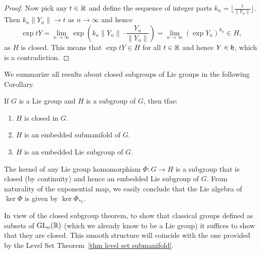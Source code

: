 \begin{proof}
    Now pick any $t\in \mathbb{R}$ and define the sequence of integer parts $k_n=\lfloor\frac{t}{\lVert Y_n\rVert}\rfloor$. Then $k_n\lVert Y_n\rVert\to t$ as $n\to\infty$ and hence
    \[\exp tY=\lim_{n\to \infty}\exp\left(k_n\lVert Y_n\rVert\cdot \frac{Y_n}{\lVert Y_n\rVert}\right)=\lim_{n\to\infty}\left(\exp Y_n\right)^{k_n}\in H,\]
    as $H$ is closed. This means that $\exp tY\in H$ for all $t\in\mathbb{R}$ and hence $Y\in\mathfrak{h}$, which is a contradiction.
\end{proof}

We summarize all results about closed subgroups of Lie groups in the following Corollary.

\begin{cor}
    If $G$ is a Lie group and $H$ is a subgroup of $G$, then \gls{tfae}:
    \begin{enumerate}
        \item $H$ is closed in $G$.
        \item $H$ is an embedded submanifold of $G$.
        \item $H$ is an embedded Lie subgroup of $G$.
    \end{enumerate}
\end{cor}

\begin{example}\label{example kernel Lie subgroup}
    The kernel of any Lie group homomorphism $\Phi:G\to H$ is a subgroup that is closed (by continuity) and hence an embedded Lie subgroup of $G$. From naturality of the exponential map, we easily conclude that the Lie algebra of $\ker \Phi$ is given by $\ker \Phi_{\ast e}$.
\end{example}

\begin{example}
    In view of the closed subgroup theorem, to show that classical groups defined as subsets of $\operatorname{GL}_n(\mathbb{R})$ (which we already know to be a Lie group) it suffices to show that they are closed. This smooth structure will coincide with the one provided by the Level Set Theorem~\ref{thm level set submanifold}.
\end{example}


